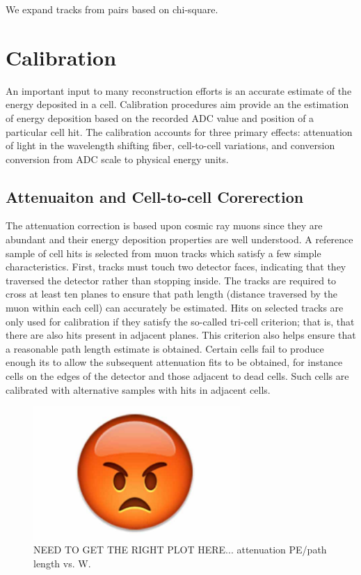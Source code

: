 We expand tracks from pairs based on chi-square.

\section{Calibration}

An important input to many reconstruction efforts is an accurate estimate of
the energy deposited in a cell.  Calibration procedures aim provide an the
estimation of energy deposition based on the recorded ADC value and position
of a particular cell hit.  The \nova calibration accounts for three primary
effects: attenuation
of light in the wavelength shifting fiber, cell-to-cell variations, and
conversion conversion from ADC scale to physical energy units.

\subsection{Attenuaiton and Cell-to-cell Corerection}

The attenuation correction is based upon cosmic ray muons since they are
abundant and their energy deposition properties are well understood.  A
reference sample of cell hits is selected from muon tracks which satisfy a few
simple characteristics.  First, tracks must touch two detector faces,
indicating that they traversed the detector rather than stopping inside.  The
tracks are required to cross at least ten planes to ensure that path length
(distance traversed by the muon within each cell) can accurately be estimated.
Hits on selected tracks are only used for calibration if they satisfy the
so-called tri-cell criterion; that is, that there are also hits present in
adjacent planes.  This criterion also helps ensure that a reasonable path
length estimate is obtained.  Certain cells fail to produce enough its to allow
the subsequent attenuation fits to be obtained, for instance cells on the edges
of the detector and those adjacent to dead cells.  Such cells are calibrated
with alternative samples with hits in adjacent cells.

\begin{figure}[t]
\begin{center}
\includegraphics[width=0.7\textwidth]{figures/dummy/dummy.jpg}
\end{center}
\caption{NEED TO GET THE RIGHT PLOT HERE... attenuation PE/path length vs. W.}
\label{calib_atten}
\end{figure}

